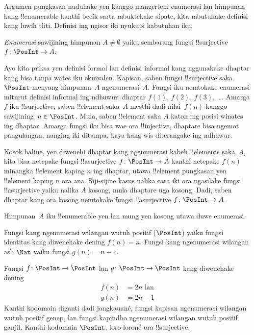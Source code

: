 \documentclass[../../../include/open-logic-section]{subfiles}
\begin{document}
Argumen pungkasan nuduhake yen kanggo mangerteni
enumerasi lan himpunan kang !!{enumerable} kanthi becik sarta mbuktekake sipate,
kita mbutuhake definisi kang luwih tliti. Definisi ing ngisor iki nyukupi kabutuhan iku.

\begin{defn}
\emph{Enumerasi} sawijining himpunan $A \neq \emptyset$ yaiku sembarang
fungsi !!{surjective} $f \colon \PosInt \to A$.
\end{defn}

\begin{explain}
Ayo kita priksa yen definisi formal lan definisi informal kang nggunakake
dhaptar kang bisa tanpa wates iku ekuivalen. Kapisan, saben fungsi
!!{surjective} saka $\PosInt$ menyang himpunan~$A$ ngenumerasi~$A$.
Fungsi iku nemtokake enumerasi miturut definisi informal ing ndhuwur:
dhaptar $f(1)$, $f(2)$, $f(3)$, \dots. Amarga $f$ iku !!{surjective},
saben !!{element} saka~$A$ mesthi dadi nilai~$f(n)$ kanggo
sawijining~$n \in \PosInt$. Mula, saben !!{element} saka $A$ katon
ing posisi winates ing dhaptar. Amarga fungsi iku bisa wae ora
!!{injective}, dhaptare bisa ngemot pangulangan, nanging iki ditampa,
kaya kang wis diterangake ing ndhuwur.

Kosok baline, yen diwenehi dhaptar kang ngenumerasi kabeh !!{element}s
saka~$A$, kita bisa netepake fungsi !!a{surjective} $f\colon \PosInt \to A$
kanthi netepake $f(n)$ minangka !!{element} kaping $n$ ing dhaptar,
utawa !!{element} pungkasan yen !!{element} kaping $n$ ora ana.
Siji-sijine kasus nalika cara iki ora ngasilake fungsi !!a{surjective}
yaiku nalika $A$ kosong, mula dhaptare uga kosong. Dadi, saben dhaptar
kang ora kosong nemtokake fungsi !!a{surjective} $f\colon \PosInt \to A$.
\end{explain}

\begin{defn}
  Himpunan~$A$ iku !!{enumerable} yen lan mung yen kosong utawa duwe enumerasi.
\end{defn}

\begin{ex}
Fungsi kang ngenumerasi wilangan wutuh positif ($\PosInt$) yaiku
fungsi identitas kang diwenehake dening $f(n) = n$. Fungsi kang ngenumerasi
wilangan asli $\Nat$ yaiku fungsi $g(n) = n - 1$.
\end{ex}

\begin{ex}
Fungsi $f\colon \PosInt \to \PosInt$ lan $g \colon \PosInt \to
\PosInt$ kang diwenehake dening
\begin{align*}
f(n) & = 2n \text{ lan}\\
g(n) & = 2n - 1
\end{align*}
Kanthi kodomain diganti dadi jangkauané, fungsi kapisan ngenumerasi wilangan wutuh
positif genep, lan fungsi kapindho ngenumerasi wilangan wutuh positif ganjil.
Kanthi kodomain $\PosInt$, loro-loroné ora !!{surjective}.
\end{ex}
\end{document}
